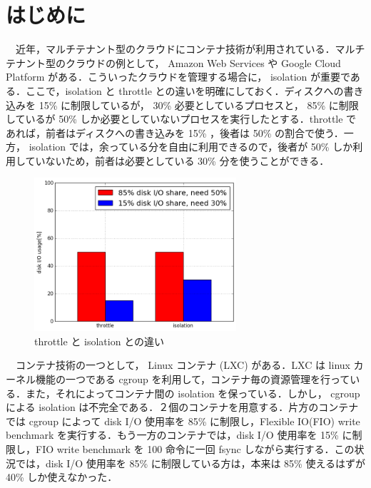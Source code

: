 \documentclass[graduation-thesis]{jsarticle}
\begin{document}
\section{はじめに}
\label{intro}
　近年，マルチテナント型のクラウドにコンテナ技術が利用されている．マルチテナント型のクラウドの例として， Amazon Web Services や Google Cloud Platform がある．こういったクラウドを管理する場合に， isolation が重要である．ここで，isolation と throttle との違いを明確にしておく．ディスクへの書き込みを 15\% に制限しているが， 30\% 必要としているプロセスと， 85\% に制限しているが 50\% しか必要としていないプロセスを実行したとする．throttle であれば，前者はディスクへの書き込みを 15\% ，後者は 50\% の割合で使う．一方， isolation では，余っている分を自由に利用できるので，後者が 50\% しか利用していないため，前者は必要としている 30\% 分を使うことができる．\\
\begin{figure}[H]
	\begin{center}
		\includegraphics[width=7.5cm]{images/isolation.png}
		\caption{throttle と isolation との違い}
		\label{fig:isolation}
	\end{center}
\end{figure}
　コンテナ技術の一つとして， Linux コンテナ (LXC) がある．LXC は linux カーネル機能の一つである cgroup を利用して，コンテナ毎の資源管理を行っている．また，それによってコンテナ間の isolation を保っている．しかし， cgroup による isolation は不完全である．２個のコンテナを用意する．片方のコンテナでは cgroup によって disk I/O 使用率を 85\% に制限し，Flexible IO(FIO) write benchmark を実行する．もう一方のコンテナでは，disk I/O 使用率を 15\% に制限し，FIO write benchmark を 100 命令に一回 fsync しながら実行する．この状況では，disk I/O 使用率を 85\% に制限している方は，本来は 85\% 使えるはずが 40\% しか使えなかった．\\
\end{document}

